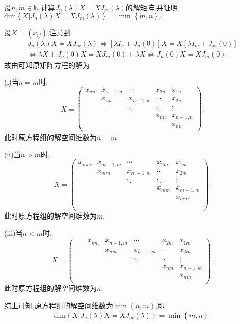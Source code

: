 \documentclass[../../main.tex]{subfiles}
\begin{document}
\begin{corollary}\label{corollary:与Jordan块J_n(lambda)可交换的矩阵}
设$n,m\in\mathbb{N}$,计算$J_n(\lambda)X = XJ_m(\lambda)$的解矩阵,并证明$\mathrm{dim}\left\{ X|J_n\left( \lambda \right) X=XJ_m\left( \lambda \right) \right\} =\min \left\{ m,n \right\}.$
\end{corollary}
\begin{solution}
设$X=(x_{ij})$,注意到
\begin{gather*}
J_n\left( \lambda \right) X=XJ_m\left( \lambda \right) \Longleftrightarrow \left[ \lambda I_n+J_n\left( 0 \right) \right] X=X\left[ \lambda I_m+J_m\left( 0 \right) \right] 
\\
\Longleftrightarrow \lambda X+J_n\left( 0 \right) X=XJ_m\left( 0 \right) +\lambda X\Longleftrightarrow J_n\left( 0 \right) X=XJ_m\left( 0 \right) .
\end{gather*}
故由可知原矩阵方程的解为

(i)当$n=m$时,
\[
X=\left( \begin{matrix}
x_{nn}&		x_{n-1,n}&		\cdots&		x_{2n}&		x_{1n}\\
&		x_{nn}&		x_{n-1,n}&		\cdots&		x_{2n}\\
&		&		\ddots&		\ddots&		\vdots\\
&		&		&		x_{nn}&		x_{n-1,n}\\
&		&		&		&		x_{nn}\\
\end{matrix} \right) .
\] 
此时原方程组的解空间维数为$n=m$.

(ii)当$n>m$时,
\[
X=\left( \begin{matrix}
x_{mm}&		x_{m-1,m}&		\cdots&		x_{2m}&		x_{1m}\\
&		x_{mm}&		x_{m-1,m}&		\cdots&		x_{2m}\\
&		&		\ddots&		\ddots&		\vdots\\
&		&		&		x_{mm}&		x_{m-1,m}\\
&		&		&		&		x_{mm}\\
&		&		&		&		\\
&		&		&		&		\\
\end{matrix} \right) .
\] 
此时原方程组的解空间维数为$m$.

(iii)当$n<m$时,
\[
X=\left( \begin{matrix}
	&		&		x_{nm}&		x_{n-1,m}&		\cdots&		x_{2m}&		x_{1m}\\
	&		&		&		x_{nm}&		x_{n-1,m}&		\cdots&		x_{2m}\\
	&		&		&		&		\ddots&		\ddots&		\vdots\\
	&		&		&		&		&		x_{nm}&		x_{n-1,m}\\
	&		&		&		&		&		&		x_{nm}\\
\end{matrix} \right) .
\] 
此时原方程组的解空间维数为$n $.

综上可知,原方程组的解空间维数为$\min \left\{ n,m \right\} $,即
\begin{align*}
\mathrm{dim}\left\{ X|J_n\left( \lambda \right) X=XJ_m\left( \lambda \right) \right\} =\min \left\{ m,n \right\}.
\end{align*}
\end{solution}
\end{document}
